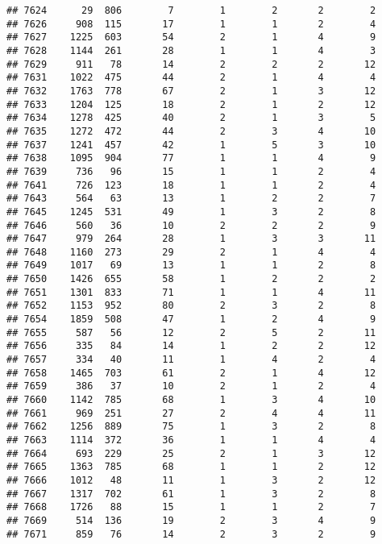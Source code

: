 \documentclass[]{article}
\begin{document}
\begin{verbatim}
## 7624      29  806        7        1        2       2        2
## 7626     908  115       17        1        1       2        4
## 7627    1225  603       54        2        1       4        9
## 7628    1144  261       28        1        1       4        3
## 7629     911   78       14        2        2       2       12
## 7631    1022  475       44        2        1       4        4
## 7632    1763  778       67        2        1       3       12
## 7633    1204  125       18        2        1       2       12
## 7634    1278  425       40        2        1       3        5
## 7635    1272  472       44        2        3       4       10
## 7637    1241  457       42        1        5       3       10
## 7638    1095  904       77        1        1       4        9
## 7639     736   96       15        1        1       2        4
## 7641     726  123       18        1        1       2        4
## 7643     564   63       13        1        2       2        7
## 7645    1245  531       49        1        3       2        8
## 7646     560   36       10        2        2       2        9
## 7647     979  264       28        1        3       3       11
## 7648    1160  273       29        2        1       4        4
## 7649    1017   69       13        1        1       2        8
## 7650    1426  655       58        1        2       2        2
## 7651    1301  833       71        1        1       4       11
## 7652    1153  952       80        2        3       2        8
## 7654    1859  508       47        1        2       4        9
## 7655     587   56       12        2        5       2       11
## 7656     335   84       14        1        2       2       12
## 7657     334   40       11        1        4       2        4
## 7658    1465  703       61        2        1       4       12
## 7659     386   37       10        2        1       2        4
## 7660    1142  785       68        1        3       4       10
## 7661     969  251       27        2        4       4       11
## 7662    1256  889       75        1        3       2        8
## 7663    1114  372       36        1        1       4        4
## 7664     693  229       25        2        1       3       12
## 7665    1363  785       68        1        1       2       12
## 7666    1012   48       11        1        3       2       12
## 7667    1317  702       61        1        3       2        8
## 7668    1726   88       15        1        1       2        7
## 7669     514  136       19        2        3       4        9
## 7671     859   76       14        2        3       2        9

\end{verbatim}
\end{document}
